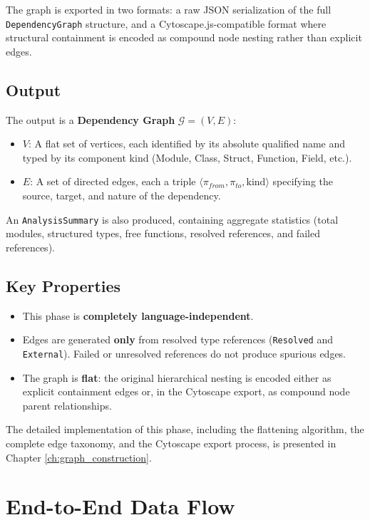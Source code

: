 The graph is exported in two formats: a raw JSON serialization of the
full \texttt{DependencyGraph} structure, and a
Cytoscape.js-compatible format \cite{TODO:cytoscape_js} where
structural containment is encoded as compound node nesting rather
than explicit edges.

\subsection{Output}

The output is a \textbf{Dependency Graph} $\mathcal{G} = (V, E)$:
\begin{itemize}
  \item $V$: A flat set of vertices, each identified by its absolute
    qualified name and typed by its component kind (Module, Class,
    Struct, Function, Field, etc.).
  \item $E$: A set of directed edges, each a triple $\langle
    \pi_{from}, \pi_{to}, \text{kind} \rangle$ specifying the source,
    target, and nature of the dependency.
\end{itemize}

An \texttt{AnalysisSummary} is also produced, containing aggregate
statistics (total modules, structured types, free functions, resolved
references, and failed references).

\subsection{Key Properties}
\begin{itemize}
  \item This phase is \textbf{completely language-independent}.
  \item Edges are generated \textbf{only} from resolved type
    references (\texttt{Resolved} and \texttt{External}). Failed or
    unresolved references do not produce spurious edges.
  \item The graph is \textbf{flat}: the original hierarchical nesting
    is encoded either as explicit containment edges or, in the
    Cytoscape export, as compound node parent relationships.
\end{itemize}

The detailed implementation of this phase, including the flattening
algorithm, the complete edge taxonomy, and the Cytoscape export
process, is presented in Chapter \ref{ch:graph_construction}.

\section{End-to-End Data Flow}
\label{sec:data_flow}

